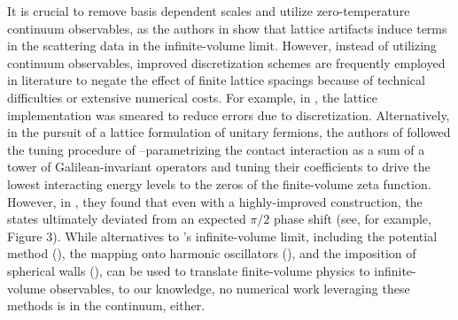 It is crucial to remove basis dependent scales and utilize zero-temperature continuum observables, as the authors in  show that lattice artifacts induce terms in the scattering data in the infinite-volume limit.
However, instead of utilizing continuum observables, improved discretization schemes are frequently employed in literature to negate the effect of finite lattice spacings because of technical difficulties or extensive numerical costs.
For example, in , the lattice implementation was smeared to reduce errors due to discretization.
Alternatively, in the pursuit of a lattice formulation of unitary fermions, the authors of  followed the tuning procedure of --parametrizing the contact interaction as a sum of a tower of Galilean-invariant operators and tuning their coefficients to drive the lowest interacting energy levels to the zeros of the \Luscher finite-volume zeta function.
However, in , they found that even with a highly-improved construction, the states ultimately deviated from an expected $\pi/2$ phase shift (see, for example, Figure 3).
While alternatives to \Luscher's infinite-volume limit, including the potential method (), the mapping onto harmonic oscillators (), and the imposition of spherical walls (), can be used to translate finite-volume physics to infinite-volume observables, to our knowledge, no numerical work leveraging these methods is in the continuum, either.

